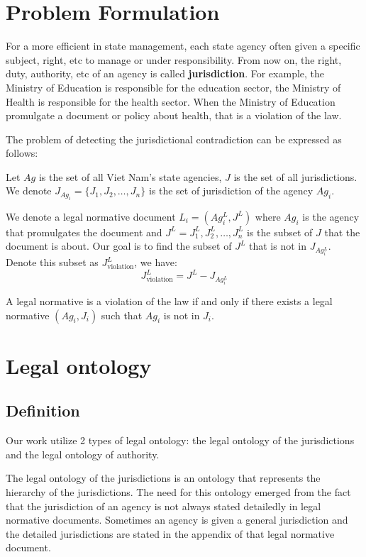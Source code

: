 \section{Problem Formulation}
    For a more efficient in state management, each state agency often given a specific subject, right, etc to manage or under responsibility. From now on, the right, duty, authority, etc of an agency is called \textbf{jurisdiction}. For example, the Ministry of Education is responsible for the education sector, the Ministry of Health is responsible for the health sector. When the Ministry of Education promulgate a document or policy about health, that is a violation of the law.

    The problem of detecting the jurisdictional contradiction can be expressed as follows:

    Let $Ag$ is the set of all Viet Nam's state agencies, $J$ is the set of all jurisdictions. We denote $J_{Ag_i} = \{J_1, J_2, \dots, J_n \}$ is the set of jurisdiction of the agency $Ag_i$.
    
    We denote a legal normative document $L_i = (Ag^L_i, J^L)$ where $Ag_i$ is the agency that promulgates the document and $J^L = J^L_1, J^L_2, \dots, J^L_n$ is the subset of $J$ that the document is about. Our goal is to find the subset of $J^L$ that is not in $J_{Ag^L_i}$. Denote this subset as $J^L_{\text{violation}}$, we have:
    $$
        J^L_{\text{violation}} = J^L - J_{Ag^L_i}
    $$

    A legal normative is a violation of the law if and only if there exists a legal normative $(Ag_i, J_i)$ such that $Ag_i$ is not in $J_i$.

\section{Legal ontology}
\subsection{Definition}

    Our work utilize 2 types of legal ontology: the legal ontology of the jurisdictions and the legal ontology of authority. 
    
    The legal ontology of the jurisdictions is an ontology that represents the hierarchy of the jurisdictions. The need for this ontology emerged from the fact that the jurisdiction of an agency is not always stated detailedly in legal normative documents. Sometimes an agency is given a general jurisdiction and the detailed jurisdictions are stated in the appendix of that legal normative document.

